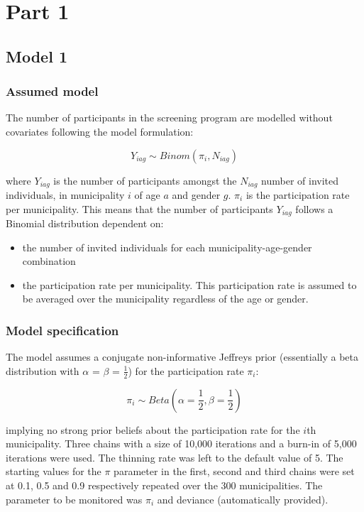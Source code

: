 \documentclass[12pt]{article}
\begin{document}
\section{Part 1}

\subsection{Model 1}

\subsubsection{Assumed model}
The number of participants in the screening program are modelled without covariates following the model formulation:

\[
    Y_{iag} \sim Binom(\pi_{i}, N_{iag})
\]

where $Y_{iag}$ is the number of participants amongst the $N_{iag}$ number of invited individuals, in municipality $i$ of age $a$ and gender $g$. $\pi_{i}$ is the participation rate per municipality. This means that the number of participants $Y_{iag}$ follows a Binomial distribution dependent on:

\begin{itemize}
    \item the number of invited individuals for each municipality-age-gender combination
    \item the participation rate per municipality. This participation rate is assumed to be averaged over the municipality regardless of the age or gender. 
\end{itemize}

\subsubsection{Model specification}

The model assumes a conjugate non-informative Jeffreys prior (essentially a beta distribution with $\alpha$ = $\beta$ = $\frac{1}{2}$) for the participation rate $\pi_i$:

\[
    \pi_{i} \sim Beta(\alpha=\frac{1}{2}, \beta=\frac{1}{2})
\]

\noindent implying no strong prior beliefs about the participation rate for the $i$th municipality. Three chains with a size of 10,000 iterations and a burn-in of 5,000 iterations were used. The thinning rate was left to the default value of 5. The starting values for the $\pi$ parameter in the first, second and third chains were set at 0.1, 0.5 and 0.9 respectively repeated over the 300 municipalities. The parameter to be monitored was $\pi_i$ and deviance (automatically provided). 
\end{document}
